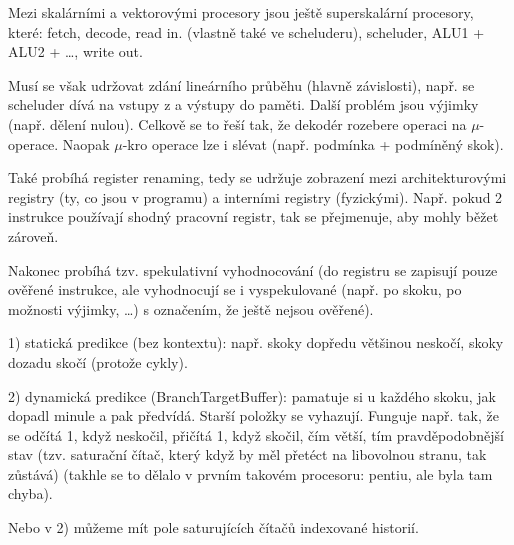 \documentclass[12pt]{article}                   %
\begin{document}
        \begin{definice}
            Mezi skalárními a vektorovými procesory jsou ještě superskalární procesory, které: fetch, decode, read in. (vlastně také ve scheluderu), scheluder, ALU1 + ALU2 + …, write out.

            Musí se však udržovat zdání lineárního průběhu (hlavně závislosti), např. se scheluder dívá na vstupy z a výstupy do paměti. Další problém jsou výjimky (např. dělení nulou). Celkově se to řeší tak, že dekodér rozebere operaci na $\mu$-operace. Naopak $\mu$-kro operace lze i slévat (např. podmínka + podmíněný skok).

            Také probíhá register renaming, tedy se udržuje zobrazení mezi architekturovými registry (ty, co jsou v programu) a interními registry (fyzickými). Např. pokud 2 instrukce používají shodný pracovní registr, tak se přejmenuje, aby mohly běžet zároveň.

            Nakonec probíhá tzv. spekulativní vyhodnocování (do registru se zapisují pouze ověřené instrukce, ale vyhodnocují se i vyspekulované (např. po skoku, po možnosti výjimky, …) s označením, že ještě nejsou ověřené).
        \end{definice}

        \begin{definice}
            1) statická predikce (bez kontextu): např. skoky dopředu většinou neskočí, skoky dozadu skočí (protože cykly).

            2) dynamická predikce (BranchTargetBuffer): pamatuje si u každého skoku, jak dopadl minule a pak předvídá. Starší položky se vyhazují. Funguje např. tak, že se odčítá 1, když neskočil, přičítá 1, když skočil, čím větší, tím pravděpodobnější stav (tzv. saturační čítač, který když by měl přetéct na libovolnou stranu, tak zůstává) (takhle se to dělalo v prvním takovém procesoru: pentiu, ale byla tam chyba).

            Nebo v 2) můžeme mít pole saturujících čítačů indexované historií.
        \end{definice}
\end{document}
